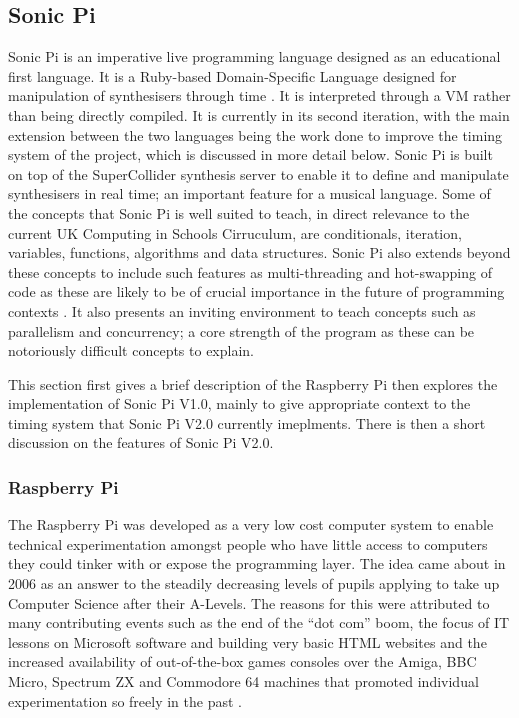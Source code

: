 \documentclass[11pt, abstracton, twoside]{scrartcl}
\begin{document}
\subsection{Sonic Pi}
Sonic Pi is an imperative live programming language designed as an educational 
first language. It is a Ruby-based Domain-Specific Language designed for 
manipulation of synthesisers through time \cite{AB13}. It is interpreted through 
a VM rather than being directly compiled. It is currently in its 
second iteration, with the main extension between the two languages being the 
work done to improve the timing system of the project, which is discussed in 
more detail below. Sonic Pi is built on top of the SuperCollider synthesis 
server to enable it to define and manipulate synthesisers in real time; an 
important feature for a musical language. Some of the concepts that Sonic Pi 
is well suited to teach, in direct relevance to the current UK Computing in 
Schools Cirruculum, are conditionals, iteration, variables, functions, 
algorithms and data structures. Sonic Pi also extends beyond these concepts to 
include such features as multi-threading and hot-swapping of code as these are 
likely to be of crucial importance in the future of programming contexts \cite{
AOB14}. It also presents an inviting environment to teach concepts such as 
parallelism and concurrency; a core strength of the program as these can be
notoriously difficult concepts to explain.

This section first gives a brief description of the Raspberry Pi then explores 
the implementation of Sonic Pi V1.0, mainly to give appropriate context to the 
timing system that Sonic Pi V2.0 currently imeplments. There is then a 
short discussion on the features of Sonic Pi V2.0.

\subsubsection{Raspberry Pi}
The Raspberry Pi was developed as a very low cost computer system to enable 
technical experimentation amongst people who have little access to computers 
they could tinker with or expose the programming layer. The idea came about in 
2006 as an answer to the steadily decreasing levels of pupils applying to take 
up Computer Science after their A-Levels. The reasons for this were attributed 
to many contributing events such as the end of the ``dot com'' boom, the focus 
of IT lessons on Microsoft software and building very basic HTML websites and 
the increased availability of out-of-the-box games consoles over the Amiga, BBC 
Micro, Spectrum ZX and Commodore 64 machines that promoted individual 
experimentation so freely in the past \cite{rp}.
\end{document}
